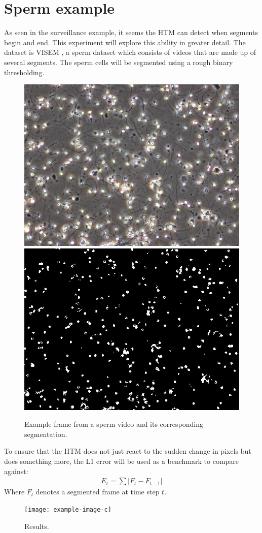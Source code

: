 \section{Sperm example}
As seen in the surveillance example, it seems the HTM can detect when segments begin and end. This experiment will explore this ability in greater detail. The dataset is VISEM \cite{VISEM}, a sperm dataset which consists of videos that are made up of several segments. The sperm cells will be segmented using a rough binary thresholding.
\begin{figure}[H]
    \centering
    \includegraphics[width=.45\textwidth]{resources/experiments/sperm/sperm_example.png}
    \includegraphics[width=.45\textwidth]{resources/experiments/sperm/sperm_seg_example.png}
    \caption{Example frame from a sperm video and its corresponding segmentation.}
\end{figure}

To ensure that the HTM does not just react to the sudden change in pixels but does something more, the L1 error will be used as a benchmark to compare against:
\begin{align*}
    E_t=\sum|F_t-F_{t-1}|
\end{align*}
Where $F_t$ denotes a segmented frame at time step $t$.
\begin{figure}[H]
    \centering
    \texttt{[image: example-image-c]}
    \caption{Results.}
\end{figure}
